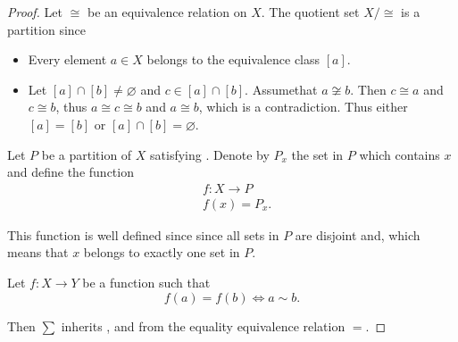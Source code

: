 \begin{proof}
   Let \( \cong \) be an equivalence relation on \( X \). The quotient set \( X / \cong \) is a partition since
  \begin{itemize}
    \item Every element \( a \in X \) belongs to the equivalence class \( [a] \).
    \item Let \( [a] \cap [b] \neq \varnothing \) and \( c \in [a] \cap [b] \). Assume\LEM that \( a \not\cong b \). Then \( c \cong a \) and \( c \cong b \), thus \( a \cong c \cong b \) and \( a \cong b \), which is a contradiction. Thus either \( [a] = [b] \) or \( [a] \cap [b] = \varnothing \).
  \end{itemize}

   Let \( P \) be a partition of \( X \) satisfying . Denote by \( P_x \) the set in \( P \) which contains \( x \) and define the function
  \begin{align*}
    &f: X \to P \\
    &f(x) = P_x.
  \end{align*}

  This function is well defined since since all sets in \( P \) are disjoint and, which means that \( x \) belongs to exactly one set in \( P \).

   Let \( f: X \to Y \) be a function such that
  \begin{equation*}
    f(a) = f(b) \iff a \sim b.
  \end{equation*}

  Then \( \sum \) inherits ,  and  from the equality equivalence relation \( = \).
\end{proof}

